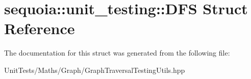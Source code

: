 \hypertarget{structsequoia_1_1unit__testing_1_1_d_f_s}{}\section{sequoia\+::unit\+\_\+testing\+::D\+FS Struct Reference}
\label{structsequoia_1_1unit__testing_1_1_d_f_s}


The documentation for this struct was generated from the following file\+:\begin{DoxyCompactItemize}
\item 
Unit\+Tests/\+Maths/\+Graph/Graph\+Traversal\+Testing\+Utils.\+hpp\end{DoxyCompactItemize}
